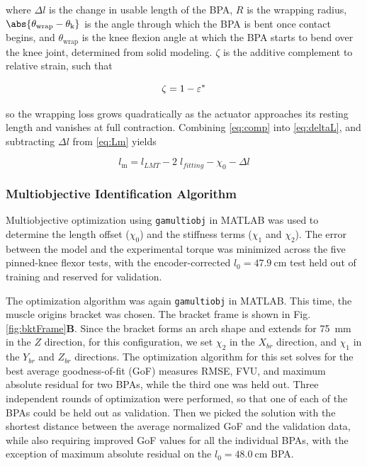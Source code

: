 where $\Delta l$ is the change in usable length of the BPA, $R$ is the wrapping radius, $\abs{\theta_\text{wrap}-\theta_\text{k}}$ is the angle through which the BPA is bent once contact begins, and $\theta_\text{wrap}$ is the knee flexion angle at which the BPA starts to bend over the knee joint, determined from solid modeling. $\zeta$ is the additive complement to relative strain, such that

\begin{equation}
    \zeta = 1-\varepsilon^*  \\
\label{eq:comp}
\end{equation}

so the wrapping loss grows quadratically as the actuator approaches its resting length and vanishes at full contraction. Combining \eqref{eq:comp} into \eqref{eq:deltaL}, and subtracting $\Delta l$ from  \eqref{eq:Lm} yields

\begin{equation}
    l_\text{m} = l_{LMT} - 2\;l_{fitting}  - \chi_{0} - \Delta l\label{eq:x3}
\end{equation}

\subsubsection{Multiobjective Identification Algorithm}\label{sec:identification}

Multiobjective optimization using \texttt{gamultiobj} in MATLAB was used to determine the length offset ($\chi_{0}$) and the stiffness terms ($\chi_{1}$ and $\chi_{2}$). The error between the model and the experimental torque was minimized across the five pinned-knee flexor tests, with the encoder-corrected $l_{0}=\qty{47.9}{\cm}$ test held out of training and reserved for validation.

The optimization algorithm was again \texttt{gamultiobj} in MATLAB. This time, the muscle origins bracket was chosen. The bracket frame is shown in Fig. \ref{fig:bktFrame}\textbf{B}. Since the bracket forms an arch shape and extends for \qty{75}{\mm} in the $Z$ direction, for this configuration, we set $\chi_{2}$ in the $X_{br}$ direction, and $\chi_{1}$ in the $Y_{br}$ and $Z_{br}$ directions. The optimization algorithm for this set solves for the best average goodness-of-fit (GoF) measures RMSE, FVU, and maximum absolute residual for two BPAs, while the third one was held out. Three independent rounds of optimization were performed, so that one of each of the BPAs could be held out as validation. Then we picked the solution with the shortest distance between the average normalized GoF and the validation data, while also requiring improved GoF values for all the individual BPAs, with the exception of maximum absolute residual on the $l_{0}=\qty{48.0}{\cm}$ BPA.

